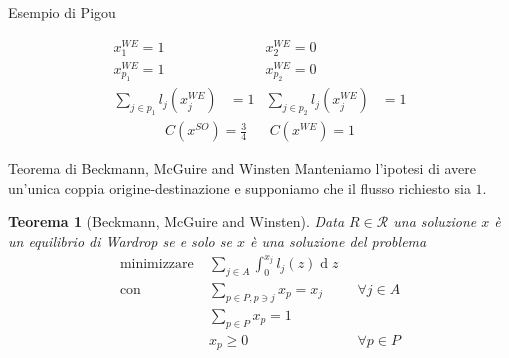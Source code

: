 \documentclass{beamer}
\newcounter{counter1}
\theoremstyle{plain}
\newtheorem{myteo}[counter1]{Teorema}
\theoremstyle{definition}
\theoremstyle{remark}
\newcommand{\pa}[1]{\left(#1\right)}
\DeclareMathOperator{\de}{d}
\begin{document}
\begin{frame}{Esempio di Pigou}
  \begin{center}
  \end{center}
  \begin{align*}
    x^{WE}_1 = 1 & & x^{WE}_2 = 0 & \\
    x^{WE}_{p_1} = 1 & & x^{WE}_{p_2} = 0 & \\
    \sum_{j\in p_1} l_j\pa{x^{WE}_j} &= 1 & \sum_{j\in p_2} l_j\pa{x^{WE}_j} &= 1
  \end{align*}
  \begin{align*}
    C\pa{x^{SO}} = \frac{3}{4} && C\pa{x^{WE}} = 1
  \end{align*}
\end{frame}

\begin{frame}{Teorema di Beckmann, McGuire and Winsten}
  Manteniamo l'ipotesi di avere un'unica coppia origine-destinazione e
  supponiamo che il flusso richiesto sia $1$.
  \begin{myteo}[Beckmann, McGuire and Winsten]
    Data $R\in \mathcal{R}$ una soluzione $x$ è un equilibrio di
    Wardrop se e solo se $x$ è una soluzione del problema
    \begin{align*}
        \text{minimizzare} \;&  \sum _{j\in A} \int _0 ^ {x_j}
        l_j(z)\de z \\
        \text{con} \;& \sum _{p\in P, p\ni j} x_p = x_j&\;\; \forall j\in
        A\\
        & \sum _{p\in P} x_p = 1 \\
        & x_p \ge 0&\;\;\forall p\in P        
    \end{align*}
  \end{myteo}
\end{frame}
\end{document}
